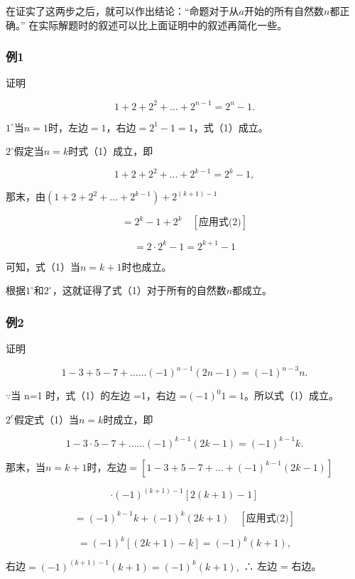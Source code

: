 在证实了这两步之后，就可以作出结论：``命题对于从\(a\)开始的所有自然数\(n\)都正确。''
在实际解题时的叙述可以比上面证明中的叙述再简化一些。

\subsubsection{例1}

证明

\[
1 + 2 + 2^{2} + \dots + 2^{n - 1} = 2^{n} - 1. \tag {1}
\]

\(1^{\circ}\)当\(n = 1\)时，左边\(= 1\)，右边\(= 2^{1} - 1 = 1\)，式（1）成立。

\(2^{\circ}\)假定当\(n = k\)时式（1）成立，即

\[
1 + 2 + 2^2+\dots + 2^{k - 1} = 2^{k} - 1, \tag {2}
\]

那末，由\((1 + 2 + 2^{2} + \dots +2^{k - 1})+2^{(k+1)-1}\)

\[
= 2^{k} - 1 + 2^{k} \quad [ \text{应用式(2)} ]
\]

\[
= 2 \cdot 2^{k} - 1 = 2^{k + 1} - 1
\]

可知，式（1）当\(n = k + 1\)时也成立。

根据\(1^{\circ}\)和\(2^{\circ}\)，这就证得了式（1）对于所有的自然数\(n\)都成立。

\subsubsection{例2}

证明

\[
1 - 3 + 5 - 7 + \dots \dots (- 1)^{n - 1} (2 n - 1) = (- 1)^{n - 3} n. \tag {1}
\]

 \(\because\)当 n=1 时，式（1）的左边 =1，右边
=\((-1)^{0}1=1\)。所以式（1）成立。

\(2^{c}\)假定式（1）当\(n = k\)时成立，即

\[
1 - 3 \cdot 5 - 7 + \dots \dots (- 1)^{k - 1} (2 k - 1) = (- 1)^{k - 1} k. \tag {2}
\]

那末，当\(n = k + 1\)时，左边\(= [1 - 3 + 5 - 7 + \dots +(-1)^{k - 1}(2k - 1)]\)

\[
\cdot (- 1)^{(k + 1) - 1} [ 2 (k+1) - 1 ]
\]

\[
= (- 1)^{k - 1} k + (- 1)^{k} (2 k + 1) \quad [ \text{应用式(2)} ]
\]

\[
= (- 1)^{k} [ (2 k + 1) - k ] = (- 1)^{k} (k + 1),
\]

右边\(= (-1)^{(k + 1) - 1}(k + 1) = (-1)^{k}(k + 1),\) ∴ 左边 = 右边。

